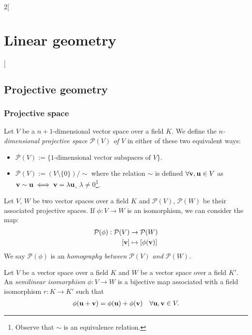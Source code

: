 \documentclass[../../../main.tex]{subfiles}
\begin{document}
\begin{multicols}{2}[\section{Linear geometry}]
  \subsection{Projective geometry}
  \subsubsection{Projective space}
  \begin{definition}
    Let $V$ be a $n+1$-dimensional vector space over a field $K$. We define the \textit{$n$-dimensional projective space $\mathcal{P}(V)$ of $V$} in either of these two equivalent ways:
    \begin{itemize}
      \item $\displaystyle\mathcal{P}(V):=\{\text{1-dimensional vector subspaces of $V$}\}$.
      \item $\displaystyle\mathcal{P}(V):=(V\setminus\{0\})/\sim$ where the relation $\sim$ is defined $\forall\boldsymbol{\mathrm{v}},\boldsymbol{\mathrm{u}}\in V$ as $\boldsymbol{\mathrm{v}}\sim \boldsymbol{\mathrm{u}}\iff \boldsymbol{\mathrm{v}}=\lambda \boldsymbol{\mathrm{u}}$, $\lambda\ne 0$\footnote{Observe that $\sim$ is an equivalence relation.}.
    \end{itemize}
  \end{definition}
  \begin{definition}
    Let $V$, $W$ be two vector spaces over a field $K$ and $\mathcal{P}(V)$, $\mathcal{P}(W)$ be their associated projective spaces. If $\phi:V\rightarrow W$ is an isomorphism, we can consider the map:
    \begin{align*}
      \mathcal{P}(\phi):\mathcal{P}(V) & \rightarrow\mathcal{P}(W)          \\
      [\vectorfunction{v}]             & \mapsto [\phi(\vectorfunction{v})]
    \end{align*}
    We say $\mathcal{P}(\phi)$ is an \textit{homography between $\mathcal{P}(V)$ and $\mathcal{P}(W)$}.
  \end{definition}
  \begin{definition}
    Let $V$ be a vector space over a field $K$ and $W$ be a vector space over a field $K'$. An \textit{semilinear isomorphism} $\phi:V\rightarrow W$ is a bijective map associated with a field isomorphism $r:K\rightarrow K'$ such that
    \begin{gather*}
      \phi(\vectorfunction{u}+\vectorfunction{v})=\phi(\vectorfunction{u})+\phi(\vectorfunction{v})\quad \forall \vectorfunction{u},\vectorfunction{v}\in V.\\

\end{gather*}
\end{definition}
\end{multicols}
\end{document}
